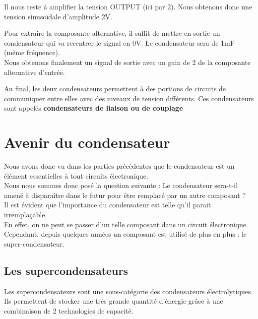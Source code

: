 
Il nous reste à amplifier la tension OUTPUT (ici par 2). Nous obtenons donc une tension sinusoïdale d'amplitude 2V. \\


Pour extraire la composante alternative, il suffit de mettre en sortie un condensateur qui va recentrer le signal en 0V.
Le condensateur sera de 1mF (même fréquence). \\
Nous obtenons finalement un signal de sortie avec un gain de 2 de la composante alternative d'entrée.\n

Au final, les deux condensateurs permettent à des portions de circuits de communiquer entre elles avec des niveaux de tension différents. Ces condensateurs sont appelés \textbf{condensateurs de liaison ou de couplage}\chapter{Avenir du condensateur}

Nous avons donc vu dans les parties précédentes que le condensateur est un élément essentielles à tout circuits électronique. \\
Nous nous sommes donc posé la question suivante : Le condensateur sera-t-il amené à disparaître dans le futur pour être remplacé par un autre composant ? \\

Il est évident que l'importance du condensateur est telle qu'il parait irremplaçable. \\ 
En effet, on ne peut se passer d'un telle composant dans un circuit électronique.\\
 Cependant, depuis quelques années un composant est utilisé de plus en plus : le super-condensateur. \\

\section{Les supercondensateurs}

Les supercondensateurs sont une sous-catégorie des condensateurs électrolytiques.\\ 
Ils permettent de stocker une très grande quantité d’énergie grâce à une combinaison de 2 technologies de capacité. \\

